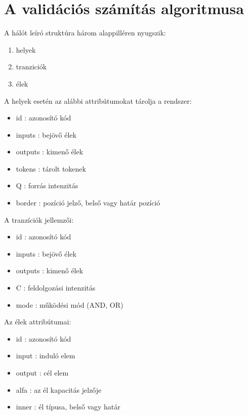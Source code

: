 \section{A validációs számítás algoritmusa}
A hálót leíró struktúra három alappilléren nyugszik:
\begin{enumerate}
\item helyek
\item tranziciók
\item élek
\end{enumerate}
A helyek esetén az alábbi attribútumokat tárolja a rendszer:
\begin{itemize}
\item id : azonosító kód
\item inputs : bejövő élek
\item outputs : kimenő élek
\item tokens : tárolt tokenek
\item Q : forrás intenzitás
\item border : pozíció jelző, belső vagy határ pozíció
\end{itemize}
        
A tranzíciók jellemzői:
\begin{itemize}
\item id : azonosító kód 
\item inputs : bejövő élek
\item outputs : kimenő élek
\item C : feldolgozási intenzitás
\item mode : működési mód (AND, OR) 
\end{itemize}

Az élek attribútumai:
\begin{itemize}
\item id : azonosító kód 
\item input : induló elem
\item output : cél elem
\item alfa : az él kapacitás jelzője
\item inner : él típusa, belső vagy határ
\end{itemize}

